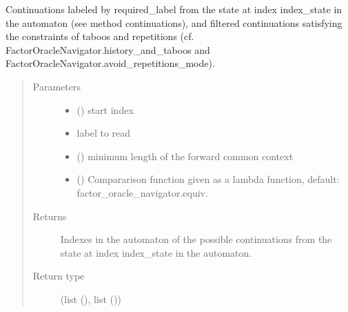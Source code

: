 \documentclass[letterpaper,10pt,english]{sphinxmanual}
\begin{document}
\begin{fulllineitems}
\begin{fulllineitems}
\label{\detokenize{index:ModelNavigator.FactorOracleNavigator.filtered_continuations_with_label}}
Continuations labeled by required\_label from the state at index index\_state in the automaton (see method continuations), and filtered continuations satisfying the constraints of taboos and repetitions (cf. FactorOracleNavigator.history\_and\_taboos and FactorOracleNavigator.avoid\_repetitions\_mode).
\begin{quote}\begin{description}
\item[{Parameters}] \leavevmode\begin{itemize}
\item {} 
 () \textendash{} start index

\item {} 
 \textendash{} label to read

\item {} 
 () \textendash{} minimum length of the forward common context

\item {} 
 () \textendash{} Compararison function given as a lambda function, default: factor\_oracle\_navigator.equiv.

\end{itemize}

\item[{Returns}] \leavevmode
Indexes in the automaton of the possible continuations from the state at index index\_state in the automaton.

\item[{Return type}] \leavevmode
{}(list (), list ())


\end{description}
\end{quote}
\end{fulllineitems}
\end{fulllineitems}
\end{document}
